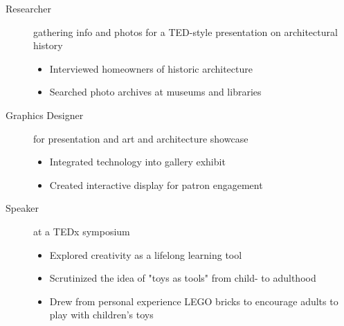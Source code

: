 \documentclass[a4paper]{deedy-resume} %
\begin{document}
    \sectionspace %

    \fi
    
    
    
    \begin{description}
    \item[Researcher] gathering info and photos for a TED-style presentation on architectural history 
    
    \iftrue

    \begin{itemize}
        \item Interviewed homeowners of historic architecture
        \item Searched photo archives at museums and libraries
    \end{itemize}

    \fi

    \item[Graphics Designer] for presentation and art and architecture showcase
    
    \iftrue

    \begin{itemize}
        \item Integrated technology into gallery exhibit
        \item Created interactive display for patron engagement
    \end{itemize}

    \fi
    \end{description}
    
    \sectionspace %
    
    

    \begin{description}
        \item[Speaker] at a TEDx symposium
        \begin{itemize}
            \item Explored creativity as a lifelong learning tool
            \item Scrutinized the idea of "toys as tools" from child- to adulthood
            \item Drew from personal experience LEGO bricks to encourage adults to play with children's toys
        \end{itemize}
    \end{description}
\end{document}
